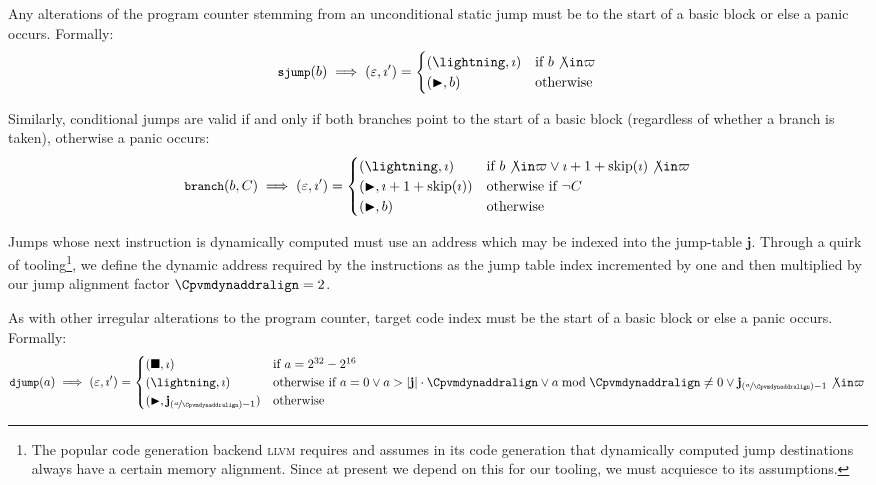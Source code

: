 Any alterations of the program counter stemming from an unconditional static jump must be to the start of a basic block or else a panic occurs. Formally:
\begin{equation}
  \token{sjump}(b) \implies \tup{\varepsilon, \imath'} = \begin{cases}
    \tup{\panic, \imath} &\when b \not\in \basicblocks \\
    \tup{\continue, b} &\otherwise
  \end{cases}
\end{equation}

Similarly, conditional jumps are valid if and only if both branches point to the start of a basic block (regardless of whether a branch is taken), otherwise a panic occurs:
\begin{equation}
  \token{branch}(b, C) \implies \tup{\varepsilon, \imath'} = \begin{cases}
    \tup{\panic, \imath} &\when b \not\in \basicblocks \lor \imath + 1 + \text{skip}(\imath) \not\in \basicblocks \\
    \tup{\continue, \imath + 1 + \Fskip(\imath)} &\otherwhen \lnot C \\
    \tup{\continue, b} &\otherwise
  \end{cases}
\end{equation}

Jumps whose next instruction is dynamically computed must use an address which may be indexed into the jump-table $\mathbf{j}$. Through a quirk of tooling\footnote{The popular code generation backend \textsc{llvm} requires and assumes in its code generation that dynamically computed jump destinations always have a certain memory alignment. Since at present we depend on this for our tooling, we must acquiesce to its assumptions.}, we define the dynamic address required by the instructions as the jump table index incremented by one and then multiplied by our jump alignment factor $\Cpvmdynaddralign = 2$.

As with other irregular alterations to the program counter, target code index must be the start of a basic block or else a panic occurs. Formally:
\begin{equation}\label{eq:jumptablealignment}
  \token{djump}(a) \implies \tup{\varepsilon, \imath'} = \begin{cases}
    \tup{\halt, \imath} &\when a = 2^{32} - 2^{16}\\
    \tup{\panic, \imath} &\otherwhen a = 0 \vee a > \len{\mathbf{j}}\cdot\Cpvmdynaddralign \vee a \bmod \Cpvmdynaddralign \ne 0 \vee \mathbf{j}_{(\nicefrac{a}{\Cpvmdynaddralign}) - 1} \not\in \basicblocks \\
    (\continue, \mathbf{j}_{(\nicefrac{a}{\Cpvmdynaddralign}) - 1}) &\otherwise
  \end{cases}
\end{equation}

